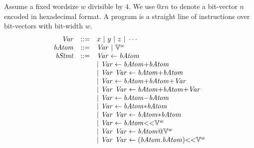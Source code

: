 Assume a fixed wordsize $w$ divisible by $4$.
We use $0xn$ to denote a bit-vector $n$ encoded in hexadecimal format.
A program is a straight line of instructions over bit-vectors with bit-width $w$.
\[
\begin{array}{rcl}
  \mathit{Var} & ::= & {x} \ |\ {y} \ |\ {z} \ |\ \cdots \\
  \mathit{bAtom} & ::= & \mathit{Var} \ |\ \mathbb{V}^w \\
  \mathit{bStmt} & ::= & \mathit{Var} \leftarrow \mathit{bAtom} \\
          &     & |\ \mathit{Var} \leftarrow \mathit{bAtom} {+} \mathit{bAtom} \\
          &     & |\ \mathit{Var}\ \mathit{Var} \leftarrow \mathit{bAtom} {+} \mathit{bAtom} \\
          &     & |\ \mathit{Var} \leftarrow \mathit{bAtom} {+} \mathit{bAtom} {+} \mathit{Var} \\
          &     & |\ \mathit{Var}\ \mathit{Var} \leftarrow \mathit{bAtom} {+} \mathit{bAtom} {+} \mathit{Var}  \\
          &     & |\ \mathit{Var} \leftarrow \mathit{bAtom} {-} \mathit{bAtom} \\
          &     & |\ \mathit{Var} \leftarrow \mathit{bAtom} {*} \mathit{bAtom} \\
          &     & |\ \mathit{Var}\ \mathit{Var} \leftarrow \mathit{bAtom} {*} \mathit{bAtom} \\
          &     & |\ \mathit{Var} \leftarrow \mathit{bAtom} {<<} \mathbb{V}^w \\
          &     & |\ \mathit{Var}\ \mathit{Var} \leftarrow \mathit{bAtom} {@} \mathbb{V}^w \\
          &     & |\ \mathit{Var}\ \mathit{Var} \leftarrow (\mathit{bAtom} {.} \mathit{bAtom}) {<<} \mathbb{V}^w
\end{array}
\]

